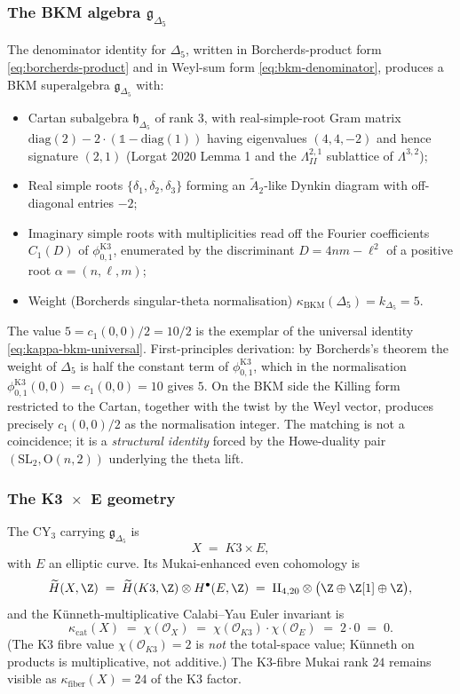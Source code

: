 \subsubsection{The BKM algebra $\mathfrak g_{\Delta_5}$}

The denominator identity for $\Delta_5$, written in Borcherds-product form \eqref{eq:borcherds-product} and in Weyl-sum form \eqref{eq:bkm-denominator}, produces a BKM superalgebra $\mathfrak g_{\Delta_5}$ with:

\begin{itemize}
 \item Cartan subalgebra $\mathfrak h_{\Delta_5}$ of rank $3$, with real-simple-root Gram matrix $\mathrm{diag}(2) - 2 \cdot (\mathbb 1 - \mathrm{diag}(1))$ having eigenvalues $(4, 4, -2)$ and hence signature $(2, 1)$ (Lorgat 2020 Lemma 1 and the $\Lambda^{2,1}_{II}$ sublattice of $\Lambda^{3,2}$);
 \item Real simple roots $\{\delta_1, \delta_2, \delta_3\}$ forming an $\widetilde A_2$-like Dynkin diagram with off-diagonal entries $-2$;
 \item Imaginary simple roots with multiplicities read off the Fourier coefficients $C_1(D)$ of $\phi_{0, 1}^{\mathrm{K3}}$, enumerated by the discriminant $D = 4nm - \ell^2$ of a positive root $\alpha = (n, \ell, m)$;
 \item Weight (Borcherds singular-theta normalisation) $\kappa_{\mathrm{BKM}}(\Delta_5) = k_{\Delta_5} = 5$.
\end{itemize}

The value $5 = c_1(0, 0)/2 = 10/2$ is the exemplar of the universal identity \eqref{eq:kappa-bkm-universal}. First-principles derivation: by Borcherds's theorem the weight of $\Delta_5$ is half the constant term of $\phi_{0, 1}^{\mathrm{K3}}$, which in the normalisation $\phi_{0, 1}^{\mathrm{K3}}(0, 0) = c_1(0, 0) = 10$ gives $5$. On the BKM side the Killing form restricted to the Cartan, together with the twist by the Weyl vector, produces precisely $c_1(0, 0)/2$ as the normalisation integer. The matching is not a coincidence; it is a \emph{structural identity} forced by the Howe-duality pair $(\mathrm{SL}_2, \mathrm{O}(n, 2))$ underlying the theta lift.

\subsubsection{The K3~$\times$~E geometry}

The CY$_3$ carrying $\mathfrak g_{\Delta_5}$ is
\[
 X \;=\; K3 \times E,
\]
with $E$ an elliptic curve. Its Mukai-enhanced even cohomology is
\[
 \widetilde H(X, \Z) \;=\; \widetilde H(K3, \Z) \otimes H^\bullet(E, \Z) \;=\; \mathrm{II}_{4, 20} \otimes \bigl(\Z \oplus \Z[1] \oplus \Z\bigr),
\]
and the K\"unneth-multiplicative Calabi--Yau Euler invariant is
\[
 \kappa_{\mathrm{cat}}(X) \;=\; \chi(\mathcal O_X) \;=\; \chi(\mathcal O_{K3}) \cdot \chi(\mathcal O_E) \;=\; 2 \cdot 0 \;=\; 0.
\]
(The K3 fibre value $\chi(\mathcal O_{K3}) = 2$ is \emph{not} the total-space value; K\"unneth on products is multiplicative, not additive.) The K3-fibre Mukai rank $24$ remains visible as $\kappa_{\mathrm{fiber}}(X) = 24$ of the K3 factor.

